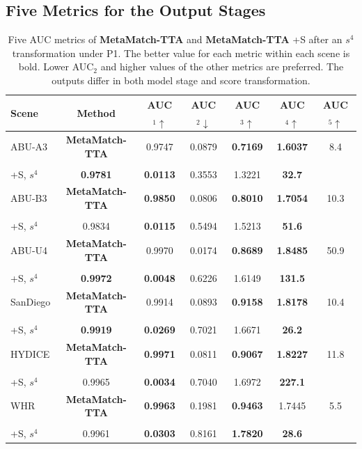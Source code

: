 \documentclass[a4paper,11pt]{article}
\renewcommand{\arraystretch}{1.18}
\newcommand{\method}{\textbf{MetaMatch-TTA}}
\begin{document}
\subsection{Five Metrics for the Output Stages}
\begin{table}[H]\centering\footnotesize\setlength{\tabcolsep}{4pt}\renewcommand{\arraystretch}{1.14}
\caption{Five AUC metrics of \method{} and \method{} +S after an $s^4$ transformation under P1. The better value for each metric within each scene is bold. Lower AUC$_2$ and higher values of the other metrics are preferred. The outputs differ in both model stage and score transformation.}\label{full:tab:p1five}
\begin{lrbox}{\fulltablebox}\begin{tabular}{lcccccc}\toprule
Scene & Method & AUC$_1\uparrow$ & AUC$_2\downarrow$ & AUC$_3\uparrow$ & AUC$_4\uparrow$ & AUC$_5\uparrow$ \\ \midrule
ABU-A3 & \textbf{\method{}} & 0.9747 & 0.0879 & \textbf{0.7169} & \textbf{1.6037} & 8.4 \\
 & \shortstack{\textbf{\method{}}\\+S, $s^4$} & \textbf{0.9781} & \textbf{0.0113} & 0.3553 & 1.3221 & \textbf{32.7} \\
ABU-B3 & \textbf{\method{}} & \textbf{0.9850} & 0.0806 & \textbf{0.8010} & \textbf{1.7054} & 10.3 \\
 & \shortstack{\textbf{\method{}}\\+S, $s^4$} & 0.9834 & \textbf{0.0115} & 0.5494 & 1.5213 & \textbf{51.6} \\
ABU-U4 & \textbf{\method{}} & 0.9970 & 0.0174 & \textbf{0.8689} & \textbf{1.8485} & 50.9 \\
 & \shortstack{\textbf{\method{}}\\+S, $s^4$} & \textbf{0.9972} & \textbf{0.0048} & 0.6226 & 1.6149 & \textbf{131.5} \\
SanDiego & \textbf{\method{}} & 0.9914 & 0.0893 & \textbf{0.9158} & \textbf{1.8178} & 10.4 \\
 & \shortstack{\textbf{\method{}}\\+S, $s^4$} & \textbf{0.9919} & \textbf{0.0269} & 0.7021 & 1.6671 & \textbf{26.2} \\
HYDICE & \textbf{\method{}} & \textbf{0.9971} & 0.0811 & \textbf{0.9067} & \textbf{1.8227} & 11.8 \\
 & \shortstack{\textbf{\method{}}\\+S, $s^4$} & 0.9965 & \textbf{0.0034} & 0.7040 & 1.6972 & \textbf{227.1} \\
WHR & \textbf{\method{}} & \textbf{0.9963} & 0.1981 & \textbf{0.9463} & 1.7445 & 5.5 \\
 & \shortstack{\textbf{\method{}}\\+S, $s^4$} & 0.9961 & \textbf{0.0303} & 0.8161 & \textbf{1.7820} & \textbf{28.6} \\
\bottomrule\end{tabular}\end{lrbox}\ifdim\wd\fulltablebox>\linewidth\resizebox{\linewidth}{!}{\usebox{\fulltablebox}}\else\usebox{\fulltablebox}\fi\end{table}
\end{document}
